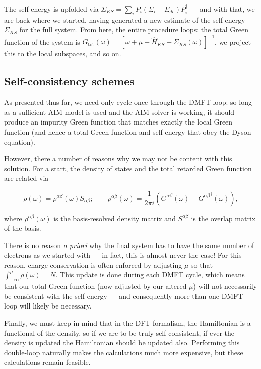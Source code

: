 \documentclass[10pt,a4paper,final]{article}
\begin{document}
The self-energy is upfolded via $\Sigma_{KS} = \sum_i P_i (\Sigma_i - E_{dc})P_i^\dag$ --- and with that, we are back where we started, having generated a new estimate of the self-energy $\Sigma_{KS}$ for the full system. From here, the entire procedure loops: the total Green function of the system is $G_\text{tot}(\omega)=[\omega+\mu-\hat H_{KS}-\Sigma_{KS}(\omega)]^{-1}$, we project this to the local subspaces, and so on.
\subsection{Self-consistency schemes}
As presented thus far, we need only cycle once through the DMFT loop: so long as a sufficient AIM model is used and the AIM solver is working, it should produce an impurity Green function that matches exactly the local Green function (and hence a total Green function and self-energy that obey the Dyson equation).

However, there a number of reasons why we may not be content with this solution. For a start, the density of states and the total retarded Green function are related via

\begin{equation}
\rho(\omega) = \rho^{\alpha\beta}(\omega)S_{\alpha\beta}; \qquad \rho^{\alpha\beta}(\omega) = \frac{1}{2\pi i}\left(G^{\alpha\beta}(\omega) - {G^{\alpha\beta}}^\dag(\omega) \right),
\end{equation}

where $\rho^{\alpha\beta}(\omega)$ is the basis-resolved density matrix and $S^{\alpha\beta}$ is the overlap matrix of the basis.

There is no reason \emph{a priori} why the final system has to have the same number of electrons as we started with --- in fact, this is almost never the case! For this reason, charge conservation is often enforced by adjusting $\mu$ so that $\int_{-\infty}^{\mu} \rho(\omega) = N$. This update is done during each DMFT cycle, which means that our total Green function (now adjusted by our altered $\mu$) will not necessarily be consistent with the self energy --- and consequently more than one DMFT loop will likely be necessary.

Finally, we must keep in mind that in the DFT formalism, the Hamiltonian is a functional of the density, so if we are to be truly self-consistent, if ever the density is updated the Hamiltonian should be updated also. Performing this double-loop naturally makes the calculations much more expensive, but these calculations remain feasible.
\end{document}
